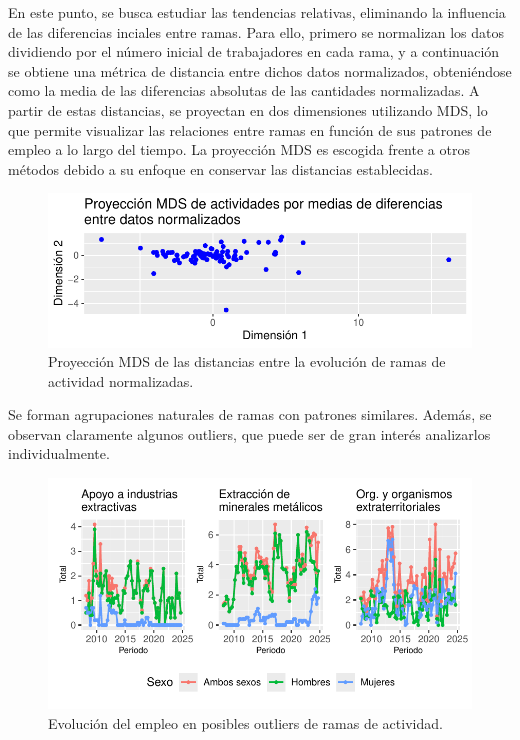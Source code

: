 \documentclass[Universitat de
València,article,submit,moreauthors,pdftex]{Definitions/mdpi}
\begin{document}
En este punto, se busca estudiar las tendencias relativas, eliminando la
influencia de las diferencias inciales entre ramas. Para ello, primero
se normalizan los datos dividiendo por el número inicial de trabajadores
en cada rama, y a continuación se obtiene una métrica de distancia entre
dichos datos normalizados, obteniéndose como la media de las diferencias
absolutas de las cantidades normalizadas. A partir de estas distancias,
se proyectan en dos dimensiones utilizando MDS, lo que permite
visualizar las relaciones entre ramas en función de sus patrones de
empleo a lo largo del tiempo. La proyección MDS es escogida frente a
otros métodos debido a su enfoque en conservar las distancias
establecidas.

\begin{figure}

{\centering \includegraphics{ProyectoAED2024_files/figure-latex/unnamed-chunk-42-1} 

}

\caption{Proyección MDS de las distancias entre la evolución de ramas de actividad normalizadas.}\label{fig:unnamed-chunk-42}
\end{figure}

Se forman agrupaciones naturales de ramas con patrones similares.
Además, se observan claramente algunos outliers, que puede ser de gran
interés analizarlos individualmente.

\begin{figure}

{\centering \includegraphics{ProyectoAED2024_files/figure-latex/unnamed-chunk-43-1} 

}

\caption{Evolución del empleo en posibles outliers de ramas de actividad.}\label{fig:unnamed-chunk-43}
\end{figure}
\end{document}
